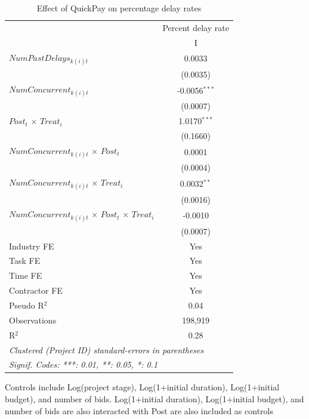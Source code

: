 \documentclass[
]{article}
\begin{document}
\begin{table}[htbp]
   \caption{Effect of QuickPay on percentage delay rates}
   \centering
   \small
   \begin{tabular}{lc}
      \toprule
                                                                     & Percent delay rate\\  
                                                                     & I\\  
      \midrule 
      $NumPastDelays_{k(i)t}$                                        & 0.0033\\   
                                                                     & (0.0035)\\   
      $NumConcurrent_{k(i)t}$                                        & -0.0056$^{***}$\\   
                                                                     & (0.0007)\\   
      $Post_t$ $\times$ $Treat_i$                                    & 1.0170$^{***}$\\   
                                                                     & (0.1660)\\   
      $NumConcurrent_{k(i)t}$ $\times$ $Post_t$                      & 0.0001\\   
                                                                     & (0.0004)\\   
      $NumConcurrent_{k(i)t}$ $\times$ $Treat_i$                     & 0.0032$^{**}$\\   
                                                                     & (0.0016)\\   
      $NumConcurrent_{k(i)t}$ $\times$ $Post_t$ $\times$ $Treat_i$   & -0.0010\\   
                                                                     & (0.0007)\\   
      \midrule 
      Industry FE                                                    & Yes\\  
      Task FE                                                        & Yes\\  
      Time FE                                                        & Yes\\  
      Contractor FE                                                  & Yes\\  
      Pseudo R$^2$                                                   & 0.04\\  
      Observations                                                   & 198,919\\  
      R$^2$                                                          & 0.28\\  
      \midrule
      \multicolumn{2}{l}{\emph{Clustered (Project ID) standard-errors in parentheses}}\\
      \multicolumn{2}{l}{\emph{Signif. Codes: ***: 0.01, **: 0.05, *: 0.1}}\\
   \end{tabular}
   
   \par \raggedright 
   Controls include Log(project stage), Log(1+initial duration), Log(1+initial budget), and number of bids. Log(1+initial duration), Log(1+initial budget), and number of bids are also interacted with Post are also included as controls
\end{table}
\end{document}
